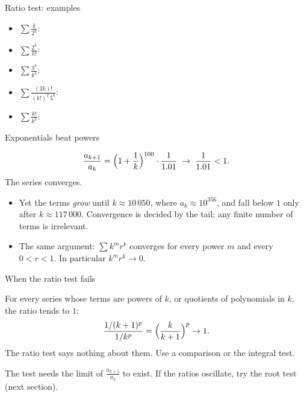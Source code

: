 \documentclass[10pt]{wosm-slides}
\begin{document}
\begin{frame}{Ratio test: examples}
  \begin{itemize}
    \item $\displaystyle\sum \frac{k}{2^k}$:
    \item $\displaystyle\sum \frac{2^k}{k!}$:
    \item $\displaystyle\sum \frac{3^k}{k^3}$:
    \item $\displaystyle\sum \frac{(2k)!}{(k!)^2\, 5^k}$:
    \item $\displaystyle\sum \frac{k!}{k^k}$:
  \end{itemize}
\end{frame}

\begin{frame}{Exponentials beat powers}
  \begin{example}
    \[ \frac{a_{k+1}}{a_k} = \Bigl(1 + \frac1k\Bigr)^{100} \cdot \frac{1}{1.01}
       \;\to\; \frac{1}{1.01} < 1 . \]
    The series converges.
  \end{example}
  \pause
  \begin{itemize}
    \item Yet the terms \emph{grow} until $k \approx 10\,050$, where $a_k \approx 10^{356}$,
      and fall below $1$ only after $k \approx 117\,000$.
      Convergence is decided by the tail; any finite number of terms is irrelevant.
    \item The same argument: $\sum k^m r^k$ converges for every power $m$ and every
      $0 < r < 1$. In particular $k^m r^k \to 0$.
  \end{itemize}
\end{frame}

\begin{frame}{When the ratio test fails}
  \begin{warning}[$L = 1$]
    For every series whose terms are powers of $k$, or quotients of polynomials in $k$,
    the ratio tends to $1$:
    \[ \frac{1/(k+1)^p}{1/k^p} = \Bigl(\frac{k}{k+1}\Bigr)^p \to 1 . \]
    The ratio test says nothing about them. Use a comparison or the integral test.
  \end{warning}
  \pause
  \begin{warning}[No limit]
    The test needs the limit of $\frac{a_{k+1}}{a_k}$ to exist.
    If the ratios oscillate, try the root test (next section).
  \end{warning}
\end{frame}
\end{document}
